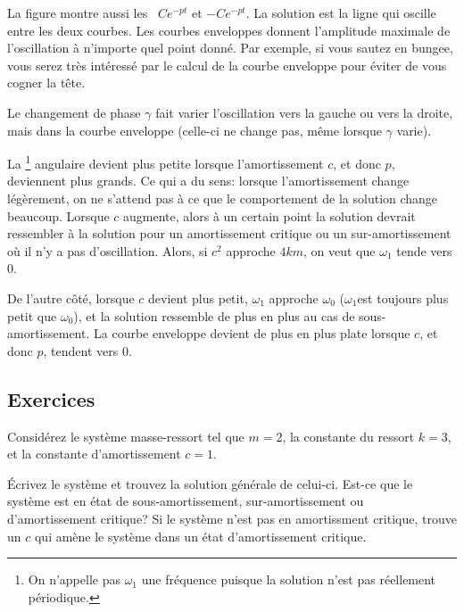 
La figure montre aussi les~\emph{} $C e^{-pt}$ et $-C e^{-pt}$.  
La solution est la ligne qui oscille entre les deux courbes. 
Les courbes enveloppes donnent l'amplitude maximale de l'oscillation à n'importe quel point donné. 
Par exemple, si vous sautez en bungee, 
vous serez très intéressé par le calcul de la courbe enveloppe pour éviter de vous cogner la tête. 

Le changement de phase $\gamma$ fait varier l'oscillation vers la gauche ou vers la droite, 
mais dans la courbe enveloppe (celle-ci ne change pas, même lorsque $\gamma$ varie).


La \emph{}\footnote{On n'appelle pas $\omega_1$ une fréquence puisque la solution n'est pas réellement périodique.} angulaire devient plus petite lorsque l'amortissement 
$c$, et donc $p$, deviennent plus grands. Ce qui a du sens: lorsque l'amortissement change légèrement, on ne s'attend pas à ce que le comportement de la solution change beaucoup. Lorsque $c$ augmente,  alors à un certain point la solution devrait ressembler à la solution pour un amortissement critique ou un sur-amortissement où il n'y a pas d'oscillation. Alors, si $c^2$ approche $4km$, on veut que $\omega_1$ tende vers 0.

De l'autre côté, lorsque $c$ devient plus petit, $\omega_1$ approche $\omega_0$
($\omega_1$est toujours plus petit que $\omega_0$), et la solution ressemble de plus en plus au cas de sous-amortissement. La courbe enveloppe devient de plus en plus plate lorsque $c$, et donc $p$, tendent vers 0.

\subsection{Exercices}

\begin{samepage}
\begin{exercise} \label{mv:ex1}
	Considérez le système masse-ressort  tel que $m=2$, la constante du ressort $k=3$, et la constante d'amortissement $c=1$.
	\begin{tasks}
		\task Écrivez le système et trouvez la solution générale de celui-ci.
		\task Est-ce que le système est en état de  sous-amortissement, sur-amortissement ou d'amortissement critique? 
		\task Si le système n'est pas en amortissment critique, trouve un $c$ qui amène le système dans un état 	
				d'amortissement critique. 
	\end{tasks}
\end{exercise}
\end{samepage}

